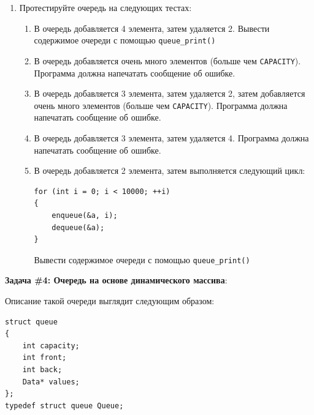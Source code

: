 \documentclass{article}
\begin{document}
\begin{enumerate}
\item Протестируйте очередь на следующих тестах:
\begin{enumerate}
\item В очередь добавляется 4 элемента, затем удаляется 2. Вывести содержимое очереди с помощью \texttt{queue\_print()}
\item В очередь добавляется очень много элементов (больше чем \texttt{CAPACITY}). Программа должна напечатать сообщение об ошибке.
\item В очередь добавляется 3 элемента, затем удаляется 2, затем добавляется очень много элементов (больше чем \texttt{CAPACITY}). Программа должна напечатать сообщение об ошибке.
\item В очередь добавляется 3 элемента, затем удаляется 4. Программа должна напечатать сообщение об ошибке.
\item В очередь добавляется 2 элемента, затем выполняется следующий цикл:
\begin{verbatim}
for (int i = 0; i < 10000; ++i)
{
    enqueue(&a, i);
    dequeue(&a);
}
\end{verbatim}
Вывести содержимое очереди с помощью \texttt{queue\_print()}
\end{enumerate}
\end{enumerate}

\textbf{Задача \#4: Очередь на основе динамического массива}:

Описание такой очереди выглядит следующим образом:
\begin{lstlisting}
struct queue
{
    int capacity;
    int front;
    int back;
    Data* values;
};
typedef struct queue Queue;
\end{lstlisting}
\end{document}
